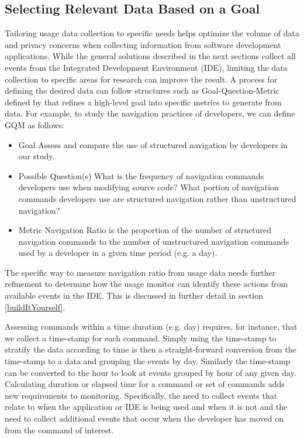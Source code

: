 \subsection{Selecting Relevant Data Based on a Goal}
\label{SelectingData}
Tailoring usage data collection to specific needs helps optimize the volume of data and privacy concerns when collecting information from software development applications.  While the general solutions described in the next sections collect all events from the Integrated Development Environment (IDE), limiting the data collection to specific areas for research can improve the result.  A process for defining the desired data can follow structures such as Goal-Question-Metric defined by   that refines a high-level goal into specific metrics to generate from data.  For example, to study the navigation practices of developers, we can define GQM as follows:
    \begin{itemize}
\item
	Goal
\subitem
	Assess and compare the use of structured navigation by developers in our study.
\item
	Possible Question(s)
\subitem
	What is the frequency of navigation commands developers use when modifying source code?
\subitem
	What portion of navigation commands developers use are structured navigation rather than unstructured navigation?
\item
	Metric
\subitem
	Navigation Ratio is the proportion of the number of structured navigation commands to the number of unstructured navigation commands used by a developer in a given time period (e.g. a day).

	    \end{itemize}

The specific way to measure navigation ratio from usage data needs further refinement to determine how the usage monitor can identify these actions from available events in the IDE. This is discussed in further detail in section \ref{buildItYourself}.

Assessing commands within a time duration (e.g. day) requires, for instance, that we collect a time-stamp for each command.  Simply using the time-stamp to stratify the data according to time is then a straight-forward conversion from the time-stamp to a data and grouping the events by day.
Similarly the time-stamp can be converted to the hour to look at events grouped by hour of any given day. Calculating duration or elapsed time for a command or set of commands adds new requirements to monitoring.  Specifically, the need to collect events that relate to when the application or IDE is being used and when it is not and the need to collect additional events that occur when the developer has moved on from the command of interest.

